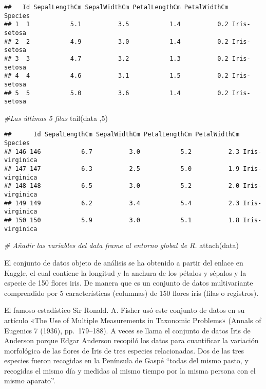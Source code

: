 \documentclass[
]{article}
\newenvironment{Shaded}{\begin{snugshade}}{\end{snugshade}}
\newcommand{\CommentTok}[1]{\textcolor[rgb]{0.56,0.35,0.01}{\textit{#1}}}
\newcommand{\DecValTok}[1]{\textcolor[rgb]{0.00,0.00,0.81}{#1}}
\newcommand{\FunctionTok}[1]{\textcolor[rgb]{0.00,0.00,0.00}{#1}}
\newcommand{\NormalTok}[1]{#1}
\begin{document}
\begin{verbatim}
##   Id SepalLengthCm SepalWidthCm PetalLengthCm PetalWidthCm     Species
## 1  1           5.1          3.5           1.4          0.2 Iris-setosa
## 2  2           4.9          3.0           1.4          0.2 Iris-setosa
## 3  3           4.7          3.2           1.3          0.2 Iris-setosa
## 4  4           4.6          3.1           1.5          0.2 Iris-setosa
## 5  5           5.0          3.6           1.4          0.2 Iris-setosa
\end{verbatim}

\begin{Shaded}
\begin{Highlighting}[]
\CommentTok{\#Las últimas 5 filas}
\FunctionTok{tail}\NormalTok{(data ,}\DecValTok{5}\NormalTok{)}
\end{Highlighting}
\end{Shaded}

\begin{verbatim}
##      Id SepalLengthCm SepalWidthCm PetalLengthCm PetalWidthCm        Species
## 146 146           6.7          3.0           5.2          2.3 Iris-virginica
## 147 147           6.3          2.5           5.0          1.9 Iris-virginica
## 148 148           6.5          3.0           5.2          2.0 Iris-virginica
## 149 149           6.2          3.4           5.4          2.3 Iris-virginica
## 150 150           5.9          3.0           5.1          1.8 Iris-virginica
\end{verbatim}

\begin{Shaded}
\begin{Highlighting}[]
\CommentTok{\# Añadir las variables del data frame al entorno global de R.}
\FunctionTok{attach}\NormalTok{(data)}
\end{Highlighting}
\end{Shaded}

El conjunto de datos objeto de análisis se ha obtenido a partir del
enlace en Kaggle, el cual contiene la longitud y la anchura de los
pétalos y sépalos y la especie de 150 flores iris. De manera que es un
conjunto de datos multivariante comprendido por 5 características
(columnas) de 150 flores iris (filas o registros).

El famoso estadístico Sir Ronald. A. Fisher usó este conjunto de datos
en su artículo «The Use of Multiple Measurements in Taxonomic Problems»
(Annals of Eugenics 7 (1936), pp.~179--188). A veces se llama el
conjunto de datos Iris de Anderson porque Edgar Anderson recopiló los
datos para cuantificar la variación morfológica de las flores de Iris de
tres especies relacionadas. Dos de las tres especies fueron recogidas en
la Península de Gaspé ``todas del mismo pasto, y recogidas el mismo día
y medidas al mismo tiempo por la misma persona con el mismo aparato''.
\end{document}
